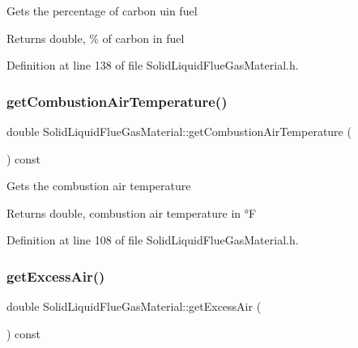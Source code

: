 Gets the percentage of carbon uin fuel \begin{DoxyReturn}{Returns}
double, \% of carbon in fuel 
\end{DoxyReturn}


Definition at line 138 of file Solid\+Liquid\+Flue\+Gas\+Material.\+h.

\mbox{\label{class_solid_liquid_flue_gas_material_a8757b831e5a2ef26dbb0cf271c0e8207}} 
\subsubsection{\texorpdfstring{get\+Combustion\+Air\+Temperature()}{getCombustionAirTemperature()}}
{\footnotesize\ttfamily double Solid\+Liquid\+Flue\+Gas\+Material\+::get\+Combustion\+Air\+Temperature (\begin{DoxyParamCaption}{ }\end{DoxyParamCaption}) const\hspace{0.3cm}{\ttfamily [inline]}}

Gets the combustion air temperature \begin{DoxyReturn}{Returns}
double, combustion air temperature in °F 
\end{DoxyReturn}


Definition at line 108 of file Solid\+Liquid\+Flue\+Gas\+Material.\+h.

\mbox{\label{class_solid_liquid_flue_gas_material_a49e7bb4ebc45897c81b6f38610ceaf02}} 
\subsubsection{\texorpdfstring{get\+Excess\+Air()}{getExcessAir()}}
{\footnotesize\ttfamily double Solid\+Liquid\+Flue\+Gas\+Material\+::get\+Excess\+Air (\begin{DoxyParamCaption}{ }\end{DoxyParamCaption}) const\hspace{0.3cm}{\ttfamily [inline]}}

